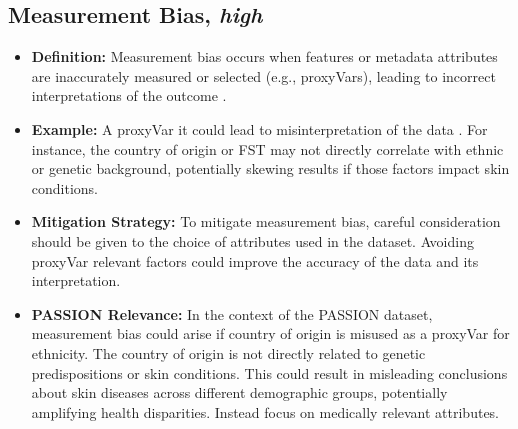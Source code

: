 \documentclass[12pt, a4paper, oneside]{book}   	%
\begin{document}
\begin{appendices}
		\subsection{Measurement Bias, \textit{high}}
		\begin{itemize}
			\item \textbf{Definition:} Measurement bias occurs when features or metadata attributes are inaccurately measured or selected (e.g., \glspl{proxyVar}), leading to incorrect interpretations of the outcome \autocite{Mehrabi_2021}.
			\item \textbf{Example:} A \gls{proxyVar} it could lead to misinterpretation of the data \autocite{Wang_2021}. For instance, the country of origin or \gls{FST} may not directly correlate with ethnic or genetic background, potentially skewing results if those factors impact skin conditions.
			\item \textbf{Mitigation Strategy:} To mitigate measurement bias, careful consideration should be given to the choice of attributes used in the dataset. Avoiding \gls{proxyVar} relevant factors could improve the accuracy of the data and its interpretation.
			\item \textbf{PASSION Relevance:} In the context of the PASSION dataset, measurement bias could arise if country of origin is misused as a \gls{proxyVar} for ethnicity. The country of origin is not directly related to genetic predispositions or skin conditions. This could result in misleading conclusions about skin diseases across different demographic groups, potentially amplifying health disparities.
			Instead focus on medically relevant attributes.
		\end{itemize}
		

\end{appendices}
\end{document}
